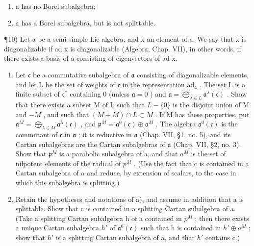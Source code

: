 \begin{enumerate}
\def\labelenumi{\roman{enumi})}
\item
  a has no Borel subalgebra;
\item
  a has a Borel subalgebra, but is not splittable.
\end{enumerate}

¶10) Let a be a semi-simple Lie algebra, and x an element of a. We say that x is diagonalizable if ad x is diagonalizable (Algebra, Chap. VII), in other words, if there exists a basis of a consisting of eigenvectors of ad x.

\begin{enumerate}
\def\labelenumi{\alph{enumi})}
\item
  Let \(\mathfrak{c}\) be a commutative subalgebra of \(\mathfrak{a}\) consisting of diagonalizable elements, and let L be the set of weights of \(\mathfrak{c}\) in the representation \(\mathrm{ad}_{\mathfrak{a}}\) . The set L is a finite subset of \(\mathfrak{c}^*\) containing 0 (unless \(\mathfrak{a} = 0\) ) and \(\mathfrak{a} = \bigoplus_{\lambda \in L} \mathfrak{a}^{\lambda}(\mathfrak{c})\) . Show that there exists a subset M of L such that \(L - \{0\}\) is the disjoint union of M and \(-M\) , and such that \((M + M) \cap L \subset M\) . If M has these properties, put \(\mathfrak{a}^{M} = \bigoplus_{\lambda \in M} \mathfrak{a}^{\lambda}(\mathfrak{c})\) , and \(\mathfrak{p}^{M} = \mathfrak{a}^{0}(\mathfrak{c}) \oplus \mathfrak{a}^{M}\) . The algebra \(\mathfrak{a}^{0}(\mathfrak{c})\) is the commutant of \(\mathfrak{c}\) in \(\mathfrak{a}\) ; it is reductive in \(\mathfrak{a}\) (Chap. VII, §1, no. 5), and its Cartan subalgebras are the Cartan subalgebras of \(\mathfrak{a}\) (Chap. VII, §2, no. 3). Show that \(\mathfrak{p}^{M}\) is a parabolic subalgebra of a, and that \(a^{M}\) is the set of nilpotent elements of the radical of \(p^{M}\) . (Use the fact that c is contained in a Cartan subalgebra of a and reduce, by extension of scalars, to the case in which this subalgebra is splitting.)
\item
  Retain the hypotheses and notations of a), and assume in addition that a is splittable. Show that c is contained in a splitting Cartan subalgebra of a. (Take a splitting Cartan subalgebra h of a contained in \(p^{M}\) ; then there exists a unique Cartan subalgebra \(h'\) of \(\mathfrak{a}^{0}(\mathfrak{c})\) such that h is contained in \(h' \oplus a^{M}\) ; show that \(h'\) is a splitting Cartan subalgebra of a, and that \(h'\) contains c.)
\end{enumerate}

